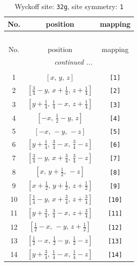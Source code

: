 \documentclass[fleqn,8pt]{jsarticle}
\begin{document}
\renewcommand{\arraystretch}{1.2}
\begin{longtable}{ccc}
\caption{Wyckoff site: {\tt 32g}, site symmetry: {\tt 1}}
 \\
 \hline \hline
No. & position & mapping \\ \hline \endfirsthead

\multicolumn{2}{l}{\tablename\ \thetable{}} \\
 \hline \hline
No. & position & mapping \\ \hline \endhead

 \hline \hline
\multicolumn{2}{r}{\footnotesize\it continued ...} \\ \endfoot

 \hline \hline
\multicolumn{2}{r}{} \\ \endlastfoot

1 & $\left[ x,\, y,\, z \right]$ & {\tt [1]} \\ \hline
2 & $\left[ \frac{3}{4} - y,\, x + \frac{1}{4},\, z + \frac{1}{4} \right]$ & {\tt [2]} \\ \hline
3 & $\left[ y + \frac{1}{4},\, \frac{1}{4} - x,\, z + \frac{1}{4} \right]$ & {\tt [3]} \\ \hline
4 & $\left[ - x,\, \frac{1}{2} - y,\, z \right]$ & {\tt [4]} \\ \hline
5 & $\left[ - x,\, - y,\, - z \right]$ & {\tt [5]} \\ \hline
6 & $\left[ y + \frac{1}{4},\, \frac{3}{4} - x,\, \frac{3}{4} - z \right]$ & {\tt [6]} \\ \hline
7 & $\left[ \frac{3}{4} - y,\, x + \frac{3}{4},\, \frac{3}{4} - z \right]$ & {\tt [7]} \\ \hline
8 & $\left[ x,\, y + \frac{1}{2},\, - z \right]$ & {\tt [8]} \\ \hline
9 & $\left[ x + \frac{1}{2},\, y + \frac{1}{2},\, z + \frac{1}{2} \right]$ & {\tt [9]} \\ \hline
10 & $\left[ \frac{1}{4} - y,\, x + \frac{3}{4},\, z + \frac{3}{4} \right]$ & {\tt [10]} \\ \hline
11 & $\left[ y + \frac{3}{4},\, \frac{3}{4} - x,\, z + \frac{3}{4} \right]$ & {\tt [11]} \\ \hline
12 & $\left[ \frac{1}{2} - x,\, - y,\, z + \frac{1}{2} \right]$ & {\tt [12]} \\ \hline
13 & $\left[ \frac{1}{2} - x,\, \frac{1}{2} - y,\, \frac{1}{2} - z \right]$ & {\tt [13]} \\ \hline
14 & $\left[ y + \frac{3}{4},\, \frac{1}{4} - x,\, \frac{1}{4} - z \right]$ & {\tt [14]} \\ \hline

\end{longtable}
\end{document}
